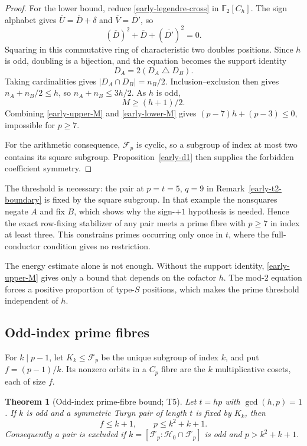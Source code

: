 \documentclass[11pt]{article}
\newtheorem{theorem}{Theorem}[section]
\theoremstyle{definition}
\theoremstyle{remark}
\begin{document}
\begin{proof}
For the lower bound, reduce \eqref{early-legendre-cross} in
$\mathbb F_2[C_h]$. The sign alphabet gives
$\overline U=\overline D+\delta$ and $\overline V=\overline{D'}$, so
\[
 (\overline D)^2+\overline D+(\overline{D'})^2=0.
\]
Squaring in this commutative ring of characteristic two doubles
positions. Since $h$ is odd, doubling is a bijection, and the equation
becomes the support identity
\begin{equation}
 D_A=2(D_A\mathbin\triangle D_B).
 \label{early-support-identity}
\end{equation}
Taking cardinalities gives $|D_A\cap D_B|=n_B/2$. Inclusion--exclusion
then gives $n_A+n_B/2\leq h$, so $n_A+n_B\leq3h/2$. As $h$ is odd,
\begin{equation}
 M\geq(h+1)/2.
 \label{early-lower-M}
\end{equation}
Combining \eqref{early-upper-M} and \eqref{early-lower-M} gives
$(p-7)h+(p-3)\leq0$, impossible for $p\geq7$.

For the arithmetic consequence, $\mathcal F_p$ is cyclic, so a subgroup
of index at most two contains its square subgroup. Proposition~\ref{early-d1}
then supplies the forbidden coefficient symmetry.
\end{proof}

The threshold is necessary: the pair at $p=t=5$, $q=9$ in
Remark~\ref{early-t2-boundary} is fixed by the square subgroup. In that
example the nonsquares negate $A$ and fix $B$, which shows why the
sign-$+1$ hypothesis is needed. Hence the exact row-fixing stabilizer of
any pair meets a prime fibre with $p\geq7$ in index at least three. This
constrains primes occurring only once in $t$, where the full-conductor
condition gives no restriction.

The energy estimate alone is not enough. Without the support identity,
\eqref{early-upper-M} gives only a bound that depends on the cofactor $h$.
The mod-$2$ equation forces a positive proportion of type-$S$ positions,
which makes the prime threshold independent of $h$.

\subsection{Odd-index prime fibres}
\label{early-odd-fibre}

For $k\mid p-1$, let $K_k\leq\mathcal F_p$ be the unique subgroup of
index $k$, and put $f=(p-1)/k$. Its nonzero orbits in a $C_p$ fibre are
the $k$ multiplicative cosets, each of size $f$.

\begin{theorem}[Odd-index prime-fibre bound; T5]
\label{early-t5}
Let $t=hp$ with $\gcd(h,p)=1$. If $k$ is odd and a symmetric Turyn pair
of length $t$ is fixed by $K_k$, then
\begin{equation}
 f\leq k+1,\qquad p\leq k^2+k+1.
 \label{early-odd-fibre-bound}
\end{equation}
Consequently a pair is excluded if
$k=[\mathcal F_p:\mathcal H_0\cap\mathcal F_p]$ is odd and
$p>k^2+k+1$.
\end{theorem}
\end{document}
